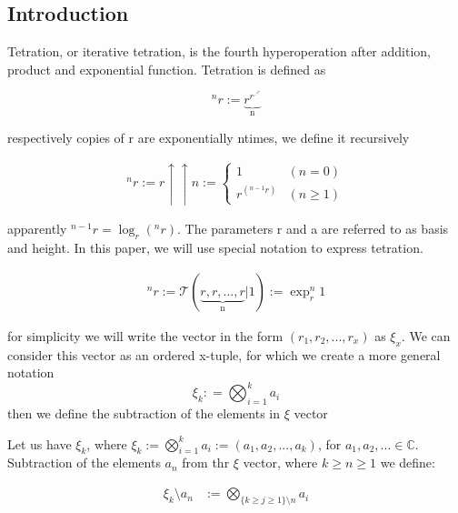 \section{}

\subsection{Introduction}

Tetration, or iterative tetration, is the fourth hyperoperation
after addition, product and exponential function. Tetration is defined as 

\[^nr := \underbrace{r^{r^{\iddots^{r}}}}_{\text{n}} \]

respectively copies of r are exponentially ntimes, we define it recursively

\begin{align}
        ^n r:= r\uparrow\uparrow n :=
        \left\{ 
        \begin{array}{ll}
                1 & (n = 0) \\
                r^{\left( ^{n-1}r \right)} & (n \geq 1)
        \end{array} 
        \right.
\end{align}

apparently \(^{n-1}r = \log_r(^n r)\). 
The parameters r and a are referred to as 
basis and height. In this paper, we will use 
special notation to express tetration.

\begin{align}
        ^n r:= \mathcal{T}(\underbrace{r, r, ..
        ., r}_{\text{n}} | 1):= \exp_r^n 1
\end{align}

for simplicity we will write the vector 
in the form \((r_1, r_2, ..., r_x)\) 
as \(\xi_x\). We can consider this vector
as an ordered x-tuple, for which we create 
a more general notation \cite{28}
\[\xi_k: = \bigotimes_{i=1}^k a_i \]
then we define the subtraction of the 
elements in \(\xi\) vector

\begin{definition}
        Let us have \(\xi_k\), where 
        \(\xi_k :=\bigotimes_{i=1}^k a_i 
        := (a_1, a_2, ..., a_k)\), for \(a_1
        , a_2, ... \in \mathbb{C}\). Subtraction 
        of the elements \(a_n\) from thr \(\xi\) 
        vector, where \(k \geq n \geq 1\) we define:
        
        \begin{align}
                \xi_k \setminus a_n &
                := \bigotimes_{\{k \geq 
                j \geq 1\} \setminus n} a_i
        \end{align}
        
\end{definition}

